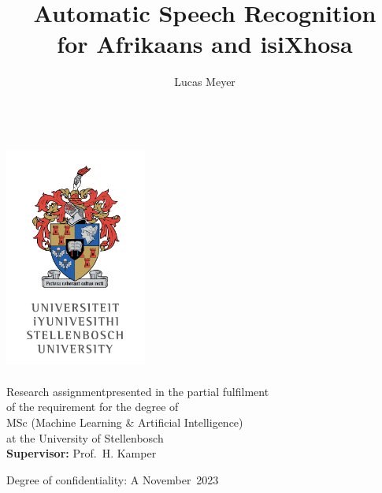 \documentclass[11pt,oneside]{report}
\title{Automatic Speech Recognition\\for Afrikaans and isiXhosa}           %
\author{Lucas Meyer}							                                          %
\makeatletter
\newif\ifmodule
\newcommand\studentnumber{22614524}                                         %
\newcommand\fulldegree{MSc (Machine Learning \& Artificial Intelligence)}   %
\newcommand\supervisor{H. Kamper}                                           %
\newcommand\supervisortitle{Prof.}                                          %
\newcommand\degreeofconf{A}                                                 %
\newcommand\yeardate{2023}								                                  %
\newcommand\monthdate{November}                                             %
\newcommand\projecttype{Research assignment}                                %
\let\thetitle\@title
\let\theauthor\@author
\makeatother
\begin{document}
\renewcommand*\listfigurename{LIST OF FIGURES} 
\renewcommand*\listtablename{LIST OF TABLES} 
\renewcommand{\appendixname}{APPENDIX}
\newtheorem{theorem}{Theorem}
\newtheorem{corollary}[theorem]{Corollary}
\newtheorem{lemma}[theorem]{Lemma}
\newtheorem{definition}[theorem]{Definition}
\ifmodule \renewcommand{\chaptername}{Task} \fi



\begin{titlepage}
	\centering
	\vspace{5cm}
	\LARGE\textbf{\thetitle}\\[1 cm]                       %
    \includegraphics[width=0.35\textwidth]{SU_Crest.png}\\[1 cm]	%
	\LARGE \textbf{\theauthor}\\ \ifmodule  \textbf{\studentnumber} \\ \fi \vspace{1.5cm} 
	\normalsize \projecttype \text{ }presented in the partial fulfilment\\
	of the requirement for the \ifmodule course \else degree of \fi \\
	\fulldegree \\
	\ifmodule \monthdate \ \yeardate \else at the University of Stellenbosch \fi \\
	\vspace{1cm}
	\textbf{\ifmodule Lecturer: \else Supervisor: \fi}\supervisortitle \ \supervisor 
	\vspace{0.75cm}
	\ifmodule \else
	\begin{flushleft}
	Degree of confidentiality: \degreeofconf \hspace{22em} \monthdate \ \yeardate
	\end{flushleft}
	\fi
\end{titlepage}
\end{document}
